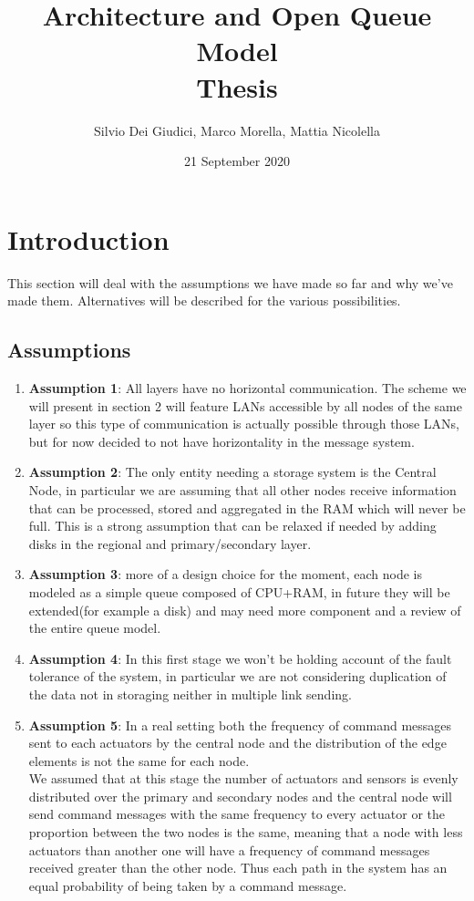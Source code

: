 \documentclass[11pt]{article}
\title {Architecture and Open Queue Model \\ \bigskip \large Thesis}
\author {Silvio Dei Giudici, Marco Morella, Mattia Nicolella}
\date{21 September 2020}
\begin{document}
\maketitle
\section{Introduction}
This section will deal with the assumptions we have made so far and why we've made them. Alternatives will be described for the various possibilities.\\
\subsection{Assumptions}
\begin{enumerate}
\item \textbf{Assumption 1}: All layers have no horizontal communication. The scheme we will present in section 2 will feature LANs accessible by all nodes of the same layer so this type of communication is actually possible through those LANs, but for now decided to not have horizontality in the message system.
\item \textbf{Assumption 2}: The only entity needing a storage system is the Central Node, in particular we are assuming that all other nodes receive information that can be processed, stored and aggregated in the RAM which will never be full. This is a strong assumption that can be relaxed if needed by adding disks in the regional and primary/secondary layer.
\item \textbf{Assumption 3}: more of a design choice for the moment, each node is modeled as a simple queue composed of CPU+RAM, in future they will be extended(for example a disk) and may need more component and a review of the entire queue model.
\item \textbf{Assumption 4}: In this first stage we won't be holding account of the fault tolerance of the system, in particular we are not considering duplication of the data not in storaging neither in multiple link sending.
\item \textbf{Assumption 5}: In a real setting both the frequency of command messages sent to each actuators by the central node and the distribution of the edge elements is not the same for each node.\\
We assumed that at this stage the number of actuators and sensors is evenly distributed over the primary and secondary nodes and the central node will send command messages with the same frequency to every actuator or the proportion between the two nodes is the same, meaning that a node with less actuators than another one will have a frequency of command messages received greater than the other node. Thus each path in the system has an equal probability of being taken by a command message.

\end{enumerate}
\end{document}
